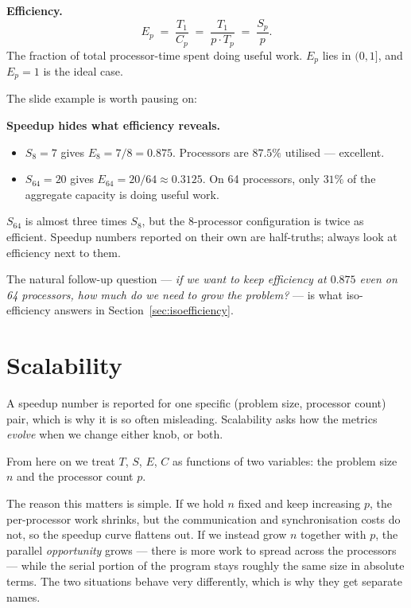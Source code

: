 \begin{ppdefn}
\textbf{Efficiency.}
\[
E_p \;=\; \frac{T_1}{C_p} \;=\; \frac{T_1}{p \cdot T_p} \;=\; \frac{S_p}{p}.
\]
The fraction of total processor-time spent doing useful work. $E_p$ lies in
$(0,1]$, and $E_p = 1$ is the ideal case.
\end{ppdefn}

The slide example is worth pausing on:

\begin{ppexample}
\textbf{Speedup hides what efficiency reveals.}
\begin{itemize}
  \item $S_{8} = 7$ gives $E_{8} = 7/8 = 0.875$. Processors are
        $87.5\%$ utilised --- excellent.
  \item $S_{64} = 20$ gives $E_{64} = 20/64 \approx 0.3125$. On 64 processors,
        only $31\%$ of the aggregate capacity is doing useful work.
\end{itemize}
$S_{64}$ is almost three times $S_8$, but the 8-processor configuration is
twice as efficient. Speedup numbers reported on their own are half-truths;
always look at efficiency next to them.

The natural follow-up question --- \emph{if we want to keep efficiency at
$0.875$ even on 64 processors, how much do we need to grow the problem?} ---
is what iso-efficiency answers in
Section~\ref{sec:isoefficiency}.
\end{ppexample}

\section{Scalability}
\label{sec:scalability}

A speedup number is reported for one specific (problem size, processor
count) pair, which is why it is so often misleading. Scalability asks how
the metrics \emph{evolve} when we change either knob, or both.

From here on we treat $T$, $S$, $E$, $C$ as functions of two variables: the
problem size $n$ and the processor count $p$.

The reason this matters is simple. If we hold $n$ fixed and keep increasing
$p$, the per-processor work shrinks, but the communication and
synchronisation costs do not, so the speedup curve flattens out. If we
instead grow $n$ together with $p$, the parallel \emph{opportunity}
grows --- there is more work to spread across the processors --- while the
serial portion of the program stays roughly the same size in absolute terms.
The two situations behave very differently, which is why they get separate
names.

